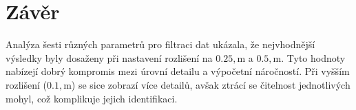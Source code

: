 \newpage
\section{Závěr}
Analýza šesti různých parametrů pro filtraci dat ukázala, že nejvhodnější výsledky byly dosaženy při nastavení rozlišení na $0.25 , \mathrm{m}$ a $0.5 , \mathrm{m}$. Tyto hodnoty nabízejí dobrý kompromis mezi úrovní detailu a výpočetní náročností. Při vyšším rozlišení ($0.1 , \mathrm{m}$) se sice zobrazí více detailů, avšak ztrácí se čitelnost jednotlivých mohyl, což komplikuje jejich identifikaci.
